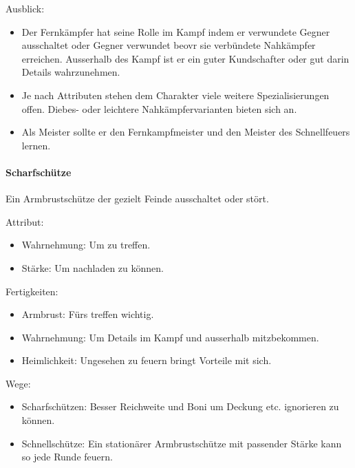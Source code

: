 \documentclass{article}
\begin{document}
Ausblick:
\begin{itemize}
\item Der Fernkämpfer hat seine Rolle im Kampf indem er verwundete Gegner ausschaltet oder Gegner verwundet beovr sie verbündete Nahkämpfer erreichen. Ausserhalb des Kampf ist er ein guter Kundschafter oder gut darin Details wahrzunehmen.
\item Je nach Attributen stehen dem Charakter viele weitere Spezialisierungen offen. Diebes- oder leichtere Nahkämpfervarianten bieten sich an.
\item Als Meister sollte er den Fernkampfmeister und den Meister des Schnellfeuers lernen.
\end{itemize}

\paragraph{Scharfschütze}
Ein Armbrustschütze der gezielt Feinde ausschaltet oder stört.

Attribut:
\begin{itemize}
\item Wahrnehmung: Um zu treffen.
\item Stärke: Um nachladen zu können.
\end{itemize}

Fertigkeiten:
\begin{itemize}
\item Armbrust: Fürs treffen wichtig.
\item Wahrnehmung: Um Details im Kampf und ausserhalb mitzbekommen.
\item Heimlichkeit: Ungesehen zu feuern bringt Vorteile mit sich.
\end{itemize}

Wege:
\begin{itemize}
\item Scharfschützen: Besser Reichweite und Boni um Deckung etc. ignorieren zu können.
\item Schnellschütze: Ein stationärer Armbrustschütze mit passender Stärke kann so jede Runde feuern.
\end{itemize}
\end{document}
